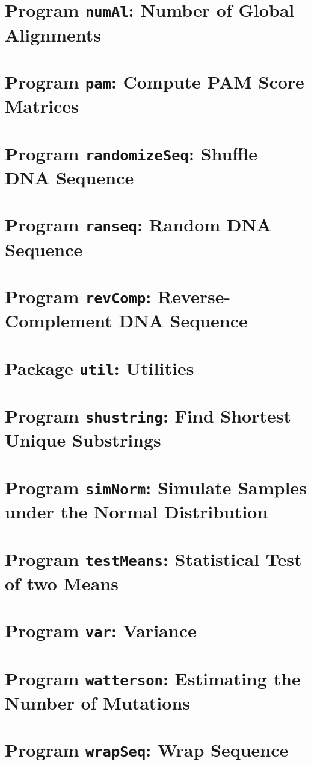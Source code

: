 \documentclass[a4paper]{report}
\begin{document}
\chapter{Program \texttt{numAl}: Number of Global Alignments}\label{ch:num}

\chapter{Program \texttt{pam}: Compute PAM Score
  Matrices}\label{ch:pam}

\chapter{Program \texttt{randomizeSeq}: Shuffle DNA
  Sequence}\label{ch:rs}

\chapter{Program \texttt{ranseq}: Random DNA Sequence}\label{ch:ran}

\chapter{Program \texttt{revComp}: Reverse-Complement DNA
  Sequence}\label{ch:rev}

\chapter{Package \texttt{util}: Utilities}\label{ch:uti}

\chapter{Program \texttt{shustring}: Find Shortest Unique Substrings}\label{ch:shu}

\chapter{Program \texttt{simNorm}: Simulate Samples under the Normal
  Distribution}\label{ch:sn}

\chapter{Program \texttt{testMeans}: Statistical Test of two Means}\label{ch:tm}

\chapter{Program \texttt{var}: Variance}\label{ch:var}

\chapter{Program \texttt{watterson}: Estimating the Number of Mutations}\label{ch:wat}

\chapter{Program \texttt{wrapSeq}: Wrap Sequence}\label{ch:wra}



\end{document}
